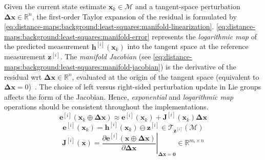 Given the current state estimate $\mathbf{x}_k\in\mathcal{M}$ and
a tangent-space perturbation $\mathbf{\Delta x}\in\mathbb{R}^{n}$,
the first-order Taylor expansion of the residual is formulated by
\eqref{eq:distance-maps:background:least-squares:manifold-linearization}.
\eqref{eq:distance-maps:background:least-squares:manifold-error} represents the
\emph{logarithmic map} of the predicted measurement
$\mathbf{h}^{[i]}(\mathbf{x}_k)$ into the tangent space at the reference
measurement $\mathbf{z}^{[i]}$.
The \emph{manifold Jacobian} (see
\eqref{eq:distance-maps:background:least-squares:manifold-jacobian})
is the derivative of the residual \gls{wrt}
$\mathbf{\Delta x}\in\mathbb{R}^{n}$, evaluated at the origin of the tangent
space (equivalent to $\mathbf{\Delta x} = 0$)~\cite{grisetti:robotics:2020}.
The choice of left versus right-sided perturbation update in Lie groups affects
the form of the Jacobian. Hence, \emph{exponential} and \emph{logarithmic map}
operations should be consistent throughout the implementations.
\begin{equation}
\label{eq:distance-maps:background:least-squares:manifold-linearization}
\mathbf{e}^{[i]}\!\left(\mathbf{x}_k \oplus \mathbf{\Delta x}\right)
\approx
\mathbf{e}^{[i]}(\mathbf{x}_k)
+ \mathbf{J}^{[i]}(\mathbf{x}_k) \mathbf{\Delta x}
\end{equation}
\begin{equation}
\label{eq:distance-maps:background:least-squares:manifold-error}
\mathbf{e}^{[i]}(\mathbf{x}_k) =
\mathbf{h}^{[i]}(\mathbf{x}_k) \ominus \mathbf{z}^{[i]}
\in \mathcal{T}_{\mathbf{z}^{[i]}}(\mathcal{M})
\end{equation}
\begin{equation}
\label{eq:distance-maps:background:least-squares:manifold-jacobian}
\mathbf{J}^{[i]}(\mathbf{x}) =
\left.
  \frac{\partial \mathbf{e}^{[i]}\!\left(\mathbf{x} \oplus \mathbf{\Delta x}\right)}
        {\partial \mathbf{\Delta x}}
\right|_{\mathbf{\Delta x}=\mathbf{0}}
\in \mathbb{R}^{m_i \times n}
\end{equation}

